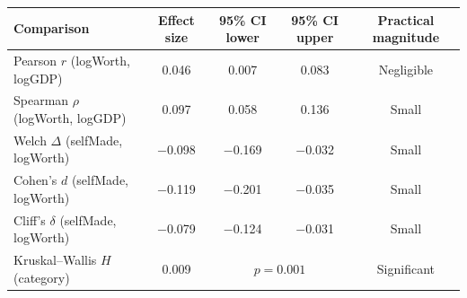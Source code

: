 \begin{tabular}{lcccc}
\toprule
Comparison & Effect size & 95\% CI lower & 95\% CI upper & Practical magnitude \\
\midrule
Pearson $r$ (logWorth, logGDP) & 0.046 & 0.007 & 0.083 & Negligible \\
Spearman $\rho$ (logWorth, logGDP) & 0.097 & 0.058 & 0.136 & Small \\
Welch $\Delta$ (selfMade, logWorth) & $-$0.098 & $-$0.169 & $-$0.032 & Small \\
Cohen's $d$ (selfMade, logWorth) & $-$0.119 & $-$0.201 & $-$0.035 & Small \\
Cliff's $\delta$ (selfMade, logWorth) & $-$0.079 & $-$0.124 & $-$0.031 & Small \\
Kruskal--Wallis $H$ (category) & 0.009 & \multicolumn{2}{c}{$p=0.001$} & Significant \\
\bottomrule
\end{tabular}